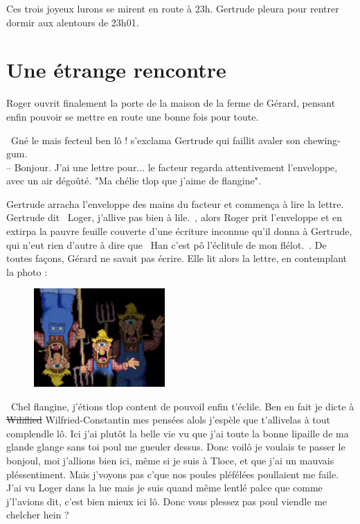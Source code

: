 \documentclass[a5paper, 10pt, twoside]{book}
\newcommand{\cg}{\guillemotleft~}
\newcommand{\cd}{~\guillemotright}
\begin{document}
Ces trois joyeux lurons se mirent en route à 23h. Gertrude pleura pour rentrer dormir aux alentours de 23h01.

\chapter{Une étrange rencontre}
Roger ouvrit finalement la porte de la maison de la ferme de Gérard, pensant enfin pouvoir se mettre en route une bonne fois pour toute.

\cg Gné le mais fecteul ben lô ! s'exclama Gertrude qui faillit avaler son chewing-gum.\\
-- Bonjour. J'ai une lettre pour... le facteur regarda attentivement l'enveloppe, avec un air dégoûté. "Ma chélie tlop que j'aime de flangine".\cd

Gertrude arracha l'enveloppe des mains du facteur et commença à lire la lettre. Gertrude dit \cg Loger, j'allive pas bien à lile.\cd, alors Roger prit l'enveloppe et en extirpa la pauvre feuille couverte d'une écriture inconnue qu'il donna à Gertrude, qui n'eut rien d'autre à dire que \cg Han c'est pô l'éclitule de mon flélot.\cd. De toutes façons, Gérard ne savait pas écrire. Elle lit alors la lettre, en contemplant la photo :

\begin{figure}
\includegraphics[width=5cm]{imgs/GerardNoir.png}
\end{figure}
\cg Chel flangine, j'étions tlop content de pouvoil enfin t'éclile. Ben en fait je dicte à \sout{Wiliflied} Wilfried-Constantin mes pensées alols j'espèle que t'allivelas à tout complendle lô. Ici j'ai plutôt la belle vie vu que j'ai toute la bonne lipaille de ma glande glange sans toi poul me gueuler dessus. Donc voilô je voulais te passer le bonjoul, moi j'allions bien ici, même si je suis à Tloce, et que j'ai un mauvais pléssentiment. Mais j'voyons pas c'que nos poules pléfélées poullaient me faile. J'ai vu Loger dans la lue mais je suis quand même lentlé palce que comme j'l'avions dit, c'est bien mieux ici lô. Donc vous plessez pas poul viendle me chelcher hein ?\cd
\end{document}

